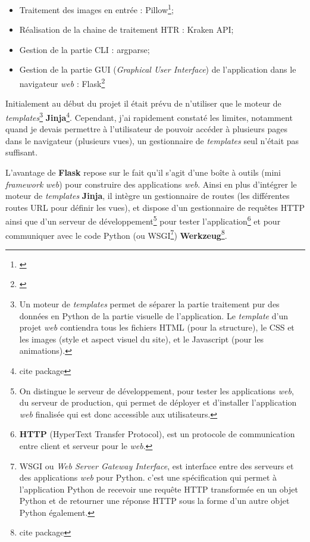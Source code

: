 \begin{itemize}
    \item Traitement des images en entrée : Pillow\footnote{\cite{noauthor_pillow_nodate}};
    \item Réalisation de la chaine de traitement HTR : Kraken API;
    \item Gestion de la partie CLI : argparse;
    \item Gestion de la partie GUI (\textit{Graphical User Interface}) de l'application dans le navigateur \textit{web} : Flask\footnote{\cite{noauthor_flask_nodate}}
\end{itemize}

Initialement au début du projet il était prévu de n'utiliser que le moteur de \textit{templates}\footnote{Un moteur de \textit{templates} permet de séparer la partie traitement pur des données en Python de la partie visuelle de l'application. Le \textit{template} d'un projet \textit{web} contiendra tous les fichiers HTML (pour la structure), le CSS et les images (style et aspect visuel du site), et le Javascript (pour les animations).} \textbf{Jinja}\footnote{cite package}. Cependant, j'ai rapidement constaté les limites, notamment quand je devais permettre à l'utilisateur de pouvoir accéder à plusieurs pages dans le navigateur (plusieurs vues), un gestionnaire de \textit{templates} seul n'était pas suffisant. 

L'avantage de \textbf{Flask} repose sur le fait qu'il s'agit d'une boîte à outils (mini \textit{framework} \textit{web}) pour construire des applications \textit{web}. Ainsi en plus d'intégrer le moteur de \textit{templates} \textbf{Jinja}, il intègre un gestionnaire de routes (les différentes routes URL pour définir les vues), et dispose d'un gestionnaire de requêtes HTTP ainsi que d'un serveur de développement\footnote{On distingue le serveur de développement, pour tester les applications \textit{web}, du serveur de production, qui permet de déployer et d'installer l'application \textit{web} finalisée qui est donc accessible aux utilisateurs.} pour tester l'application\footnote{\textbf{HTTP} (HyperText Transfer Protocol), est un protocole de communication entre client et serveur pour le \textit{web}.} et pour communiquer avec le code Python (ou WSGI\footnote{WSGI ou \textit{Web Server Gateway Interface}, est interface entre des serveurs et des applications \textit{web} pour Python. c'est une spécification qui permet à l'application Python de recevoir une requête HTTP transformée en un objet Python et de retourner une réponse HTTP sous la forme d’un autre objet Python également.}) \textbf{Werkzeug}\footnote{cite package}.\\


